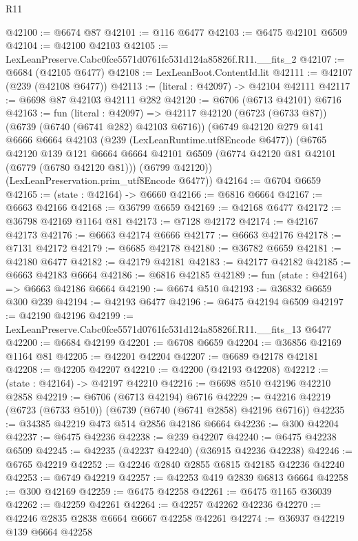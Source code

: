 \begin{lexlean}{R11}
\begin{coremodule}
@42100 := @6674 @87
@42101 := @116 @6477
@42103 := @6475 @42101 @6509
@42104 := @42100 @42103
@42105 := LexLeanPreserve.Cabc0fce5571d0761fc531d124a85826f.R11.__fits_2
@42107 := @6684 (@42105 @6477)
@42108 := LexLeanBoot.ContentId.lit
@42111 := @42107 (@239 (@42108 @6477))
@42113 := (literal : @42097) -> @42104 @42111
@42117 := @6698 @87 @42103 @42111 @282
@42120 := @6706 (@6713 @42101) @6716
@42163 := fun (literal : @42097) =>
  @42117
    @42120
    (@6723 (@6733 @87))
    (@6739 (@6740 (@6741 @282) @42103 @6716))
    (@6749
      @42120
      @279
      @141
      @6666
      @6664
      @42103
      (@239 (LexLeanRuntime.utf8Encode @6477))
      (@6765
        @42120
        @139
        @121
        @6664
        @6664
        @42101
        @6509
        (@6774 @42120 @81 @42101 (@6779 (@6780 @42120 @81)))
        (@6799 @42120))
      (LexLeanPreservation.prim_utf8Encode @6477))
@42164 := @6704 @6659
@42165 := (state : @42164) -> @6660
@42166 := @6816 @6664
@42167 := @6663 @42166
@42168 := @36799 @6659
@42169 := @42168 @6477
@42172 := @36798 @42169 @1164 @81
@42173 := @7128 @42172
@42174 := @42167 @42173
@42176 := @6663 @42174 @6666
@42177 := @6663 @42176
@42178 := @7131 @42172
@42179 := @6685 @42178
@42180 := @36782 @6659
@42181 := @42180 @6477
@42182 := @42179 @42181
@42183 := @42177 @42182
@42185 := @6663 @42183 @6664
@42186 := @6816 @42185
@42189 := fun (state : @42164) => @6663 @42186 @6664
@42190 := @6674 @510
@42193 := @36832 @6659 @300 @239
@42194 := @42193 @6477
@42196 := @6475 @42194 @6509
@42197 := @42190 @42196
@42199 := LexLeanPreserve.Cabc0fce5571d0761fc531d124a85826f.R11.__fits_13 @6477
@42200 := @6684 @42199
@42201 := @6708 @6659
@42204 := @36856 @42169 @1164 @81
@42205 := @42201 @42204
@42207 := @6689 @42178 @42181
@42208 := @42205 @42207
@42210 := @42200 (@42193 @42208)
@42212 := (state : @42164) -> @42197 @42210
@42216 := @6698 @510 @42196 @42210 @2858
@42219 := @6706 (@6713 @42194) @6716
@42229 := @42216 @42219 (@6723 (@6733 @510)) (@6739 (@6740 (@6741 @2858) @42196 @6716))
@42235 := @34385 @42219 @473 @514 @2856 @42186 @6664
@42236 := @300 @42204
@42237 := @6475 @42236
@42238 := @239 @42207
@42240 := @6475 @42238 @6509
@42245 := @42235 (@42237 @42240) (@36915 @42236 @42238)
@42246 := @6765 @42219
@42252 := @42246 @2840 @2855 @6815 @42185 @42236 @42240
@42253 := @6749 @42219
@42257 := @42253 @419 @2839 @6813 @6664
@42258 := @300 @42169
@42259 := @6475 @42258
@42261 := @6475 @1165 @36039
@42262 := @42259 @42261
@42264 := @42257 @42262 @42236
@42270 := @42246 @2835 @2838 @6664 @6667 @42258 @42261
@42274 := @36937 @42219 @139 @6664 @42258

\end{coremodule}
\end{lexlean}
